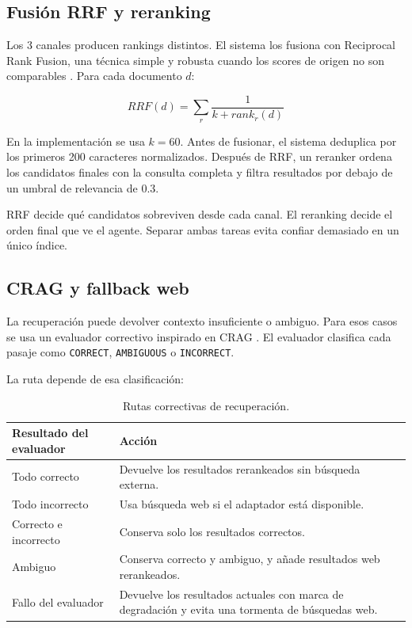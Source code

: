 \subsection{Fusión RRF y reranking}

Los 3 canales producen rankings distintos. El sistema los fusiona con
Reciprocal Rank Fusion, una técnica simple y robusta cuando los scores de
origen no son comparables \cite{cormack2009rrf}. Para cada documento $d$:

\[
RRF(d)=\sum_r \frac{1}{k + rank_r(d)}
\]

En la implementación se usa $k=60$. Antes de fusionar, el sistema deduplica por
los primeros 200 caracteres normalizados. Después de RRF, un reranker ordena
los candidatos finales con la consulta completa y filtra resultados por debajo
de un umbral de relevancia de 0.3.

RRF decide qué candidatos sobreviven desde cada canal. El reranking decide el
orden final que ve el agente. Separar ambas tareas evita confiar demasiado en
un único índice.

\subsection{CRAG y fallback web}

La recuperación puede devolver contexto insuficiente o ambiguo. Para esos
casos se usa un evaluador correctivo inspirado en CRAG
\cite{yan2024corrective}. El evaluador clasifica cada pasaje como
\texttt{CORRECT}, \texttt{AMBIGUOUS} o \texttt{INCORRECT}.

La ruta depende de esa clasificación:

\begin{table}[H]
\begin{center}
\small
\begin{tabular}{|p{3.5cm}|p{8.4cm}|} \hline
\textbf{Resultado del evaluador} & \textbf{Acción} \\ \hline
Todo correcto & Devuelve los resultados rerankeados sin búsqueda externa. \\ \hline
Todo incorrecto & Usa búsqueda web si el adaptador está disponible. \\ \hline
Correcto e incorrecto & Conserva solo los resultados correctos. \\ \hline
Ambiguo & Conserva correcto y ambiguo, y añade resultados web rerankeados. \\ \hline
Fallo del evaluador & Devuelve los resultados actuales con marca de degradación y evita una tormenta de búsquedas web. \\ \hline
\end{tabular}
\caption{Rutas correctivas de recuperación.}
\end{center}
\end{table}


